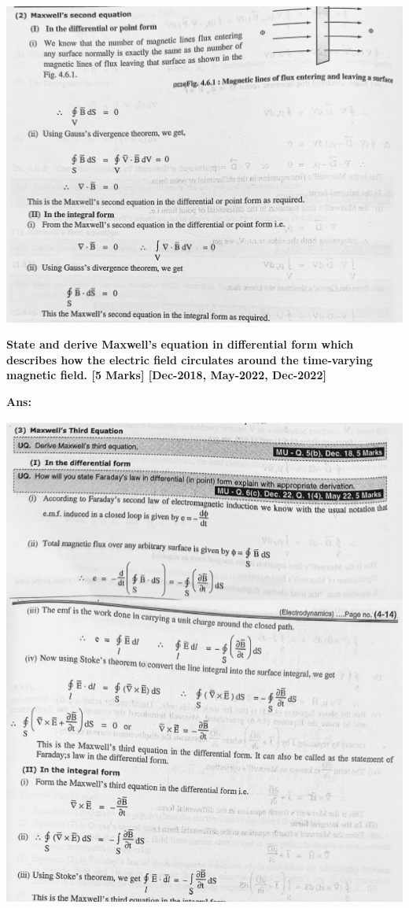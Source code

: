 \documentclass{exam}
\begin{document}
\begin{questions}
\begin{center}
\includegraphics[scale=0.1]{Q1-3.jpeg} \\
\end{center}
	
\question \textbf{ State and derive Maxwell’s equation in differential form which describes how the electric field circulates around the time-varying magnetic field. \hfil [5 Marks] [Dec-2018, May-2022, Dec-2022] }

\textbf{Ans:}
\begin{center}
\includegraphics[scale=0.55]{Q2.png} 
\end{center}


\end{questions}
\end{document}
